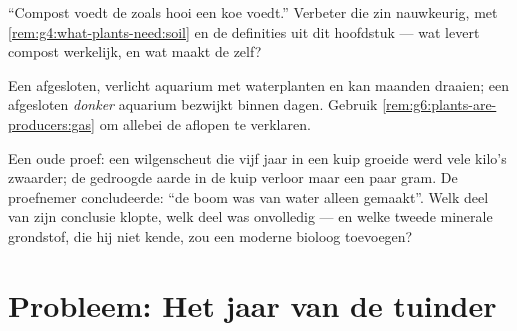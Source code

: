 \begin{exercise}[$\star\star$]\label{exo:g6:plants-are-producers:10}
``Compost voedt de  zoals hooi een koe voedt.'' Verbeter die zin
nauwkeurig, met \cref{rem:g4:what-plants-need:soil} en de definities uit
dit hoofdstuk --- wat levert compost werkelijk, en wat maakt de 
zelf?
\end{exercise}

\begin{exercise}[$\star\star$]\label{exo:g6:plants-are-producers:11}
Een afgesloten, verlicht aquarium met waterplanten en  kan maanden
draaien; een afgesloten \emph{donker} aquarium bezwijkt binnen dagen.
Gebruik \cref{rem:g6:plants-are-producers:gas} om allebei de aflopen te
verklaren.
\end{exercise}

\begin{exercise}[$\star\star\star$]\label{exo:g6:plants-are-producers:12}
Een oude proef: een wilgenscheut die vijf jaar in een kuip groeide werd
vele kilo's zwaarder; de gedroogde aarde in de kuip verloor maar een paar
gram. De proefnemer concludeerde: ``de boom was van water alleen
gemaakt''. Welk deel van zijn conclusie klopte, welk deel was
onvolledig --- en welke tweede minerale grondstof, die hij niet kende,
zou een moderne bioloog toevoegen?
\end{exercise}

\section{Probleem: Het jaar van de tuinder}

